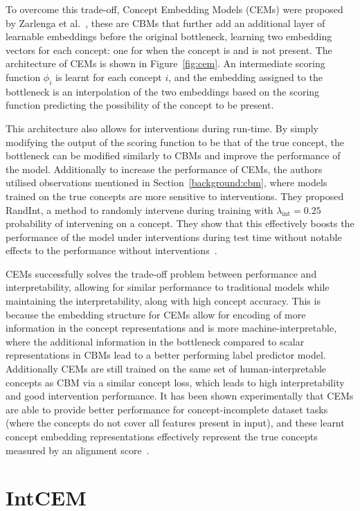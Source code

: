 \documentclass[../main.tex]{subfiles}
\begin{document}
To overcome this trade-off, Concept Embedding Models (CEMs) were proposed by Zarlenga et al.~\cite{cem},
these are CBMs that further add an additional layer of learnable embeddings before
the original bottleneck, learning two embedding vectors for each concept: one for
when the concept is and is not present. The architecture of CEMs is shown in Figure~\ref{fig:cem}.
An intermediate scoring function $\phi_i$ is learnt for each concept $i$, 
and the embedding assigned to the bottleneck is an interpolation of the two embeddings
based on the scoring function predicting the possibility of the concept to be present.

This architecture also allows for interventions during run-time. By simply modifying the
output of the scoring function to be that of the true concept, the bottleneck 
can be modified similarly to CBMs and improve the performance of the model. Additionally
to increase the performance of CEMs, the authors utilised observations mentioned in
Section~\ref{background:cbm}, where models trained on the true concepts are more sensitive to 
interventions. They proposed RandInt, a method to randomly intervene
during training with $\lambda_{\text{int}} = 0.25$ probability of intervening
on a concept. They show that this effectively boosts the performance of the model 
under interventions during test time without notable effects to the performance 
without interventions~\cite{cem}.

CEMs successfully solves the trade-off problem between performance and interpretability,
allowing for similar performance to traditional models while maintaining the
interpretability, along with high concept accuracy. This is because the embedding structure
for CEMs allow for encoding of more information
in the concept representations and is more machine-interpretable, where
the additional information in the bottleneck
 compared to scalar representations in CBMs
lead to a better performing label predictor model. Additionally CEMs are still trained 
on the same set of human-interpretable concepts as CBM via a similar concept loss, which leads to
high interpretability and good intervention performance. It has been shown experimentally
that CEMs are able to provide better performance for concept-incomplete dataset tasks (where
the concepts do not cover all features present in input), and these learnt concept
embedding representations effectively represent the true concepts measured by an alignment score~\cite{cem}.

\section{IntCEM} %
\end{document}

